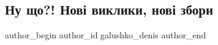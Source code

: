  
 
 
 
 

\subsection{Ну що?!  Нові виклики, нові збори}
\label{sec:11_10_2022.fb.galushko_denis.1.nu_shcho___nov__vik}

\ifcmt
 author_begin
   author_id galushko_denis
 author_end
\fi
